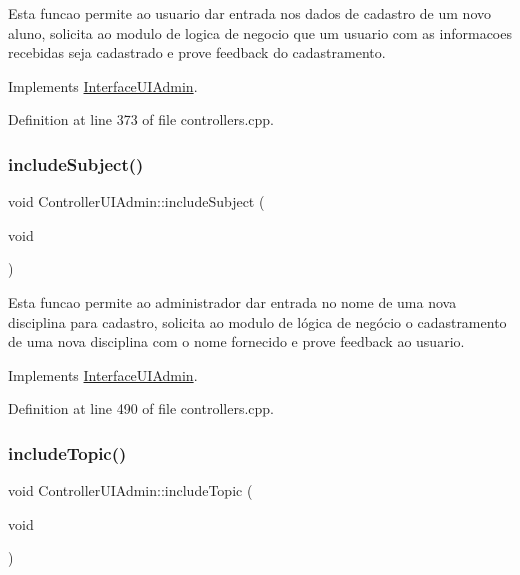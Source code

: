 Esta funcao permite ao usuario dar entrada nos dados de cadastro de um novo aluno, solicita ao modulo de logica de negocio que um usuario com as informacoes recebidas seja cadastrado e prove feedback do cadastramento. 

Implements \hyperlink{class_interface_u_i_admin_a1fe189d6258d112e4165f69f5326752d}{Interface\+U\+I\+Admin}.



Definition at line 373 of file controllers.\+cpp.

\mbox{\label{class_controller_u_i_admin_a7c31484c26788da7ea3d551bbf9f82f8}} 
\subsubsection{\texorpdfstring{include\+Subject()}{includeSubject()}}
{\footnotesize\ttfamily void Controller\+U\+I\+Admin\+::include\+Subject (\begin{DoxyParamCaption}\item[{void}]{ }\end{DoxyParamCaption})\hspace{0.3cm}{\ttfamily [virtual]}}

Esta funcao permite ao administrador dar entrada no nome de uma nova disciplina para cadastro, solicita ao modulo de lógica de negócio o cadastramento de uma nova disciplina com o nome fornecido e prove feedback ao usuario. 

Implements \hyperlink{class_interface_u_i_admin_aeb5d10fa8f9633ed73e52bb61d10f40a}{Interface\+U\+I\+Admin}.



Definition at line 490 of file controllers.\+cpp.

\mbox{\label{class_controller_u_i_admin_adb83b8e77cde718af7571e4d256b6b63}} 
\subsubsection{\texorpdfstring{include\+Topic()}{includeTopic()}}
{\footnotesize\ttfamily void Controller\+U\+I\+Admin\+::include\+Topic (\begin{DoxyParamCaption}\item[{void}]{ }\end{DoxyParamCaption})\hspace{0.3cm}{\ttfamily [virtual]}}

